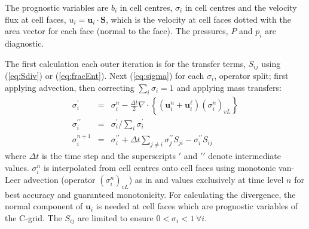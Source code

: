 \documentclass[draft]{agujournal2019}
\begin{document}
The prognostic variables are  $b_{i}$ in cell centres,  $\sigma_{i}$
in cell centres and the velocity flux at cell faces, $u_{i}=\mathbf{u}_{i}\cdot\mathbf{S}$,
which is the velocity at cell faces dotted with the area vector for
each face (normal to the face). The pressures, $P$ and $p_{i}$ are
diagnostic.

{The first calculation each outer iteration is for the transfer terms, $S_{ij}$ using ({\protect\ref{eq:Sdiv}}) or ({\protect\ref{eq:fracEnt}}). Next}
(\ref{eq:sigma}) 
for each $\sigma_{i}$, operator split; first applying advection,
then correcting $\sum_{i}\sigma_{i}=1$ and  applying mass transfers:
\begin{eqnarray}
\sigma_{i}^{\prime} & = & \sigma_{i}^{n}-\frac{\Delta t}{2}\nabla\cdot\left\{ \left(\mathbf{u}_{i}^{n}+\mathbf{u}_{i}^{\ell}\right)\left(\sigma_{i}^{n}\right)_{vL}\right\}
\\
\sigma_{i}^{\prime\prime} & = & \sigma_{i}^{\prime}\bigg/\sum_{i}\sigma_{i}^{\prime}
\\
\sigma_{i}^{n+1} & = & \sigma_{i}^{\prime\prime}+\Delta t\sum_{j\ne i}\sigma_{j}^{\prime\prime}S_{ji}-\sigma_{i}^{\prime\prime}S_{ij}
\end{eqnarray}
where $\Delta t$ is the time step and the superscripts $\prime$
and $\prime\prime$ denote intermediate values. $\sigma_{i}^{n}$
is interpolated from cell centres onto cell faces using monotonic
van-Leer advection (operator $(\sigma_{i}^{n})_{vL}$) as in 
and values exclusively at time level $n$ for best accuracy and guaranteed
monotonicity. For calculating the divergence, the normal component
of $\mathbf{u}_{i}$ is needed at cell faces which are prognostic
variables of the C-grid. The $S_{ij}$ are limited to ensure $0<\sigma_{i}<1\ \forall i$. 
\end{document}
